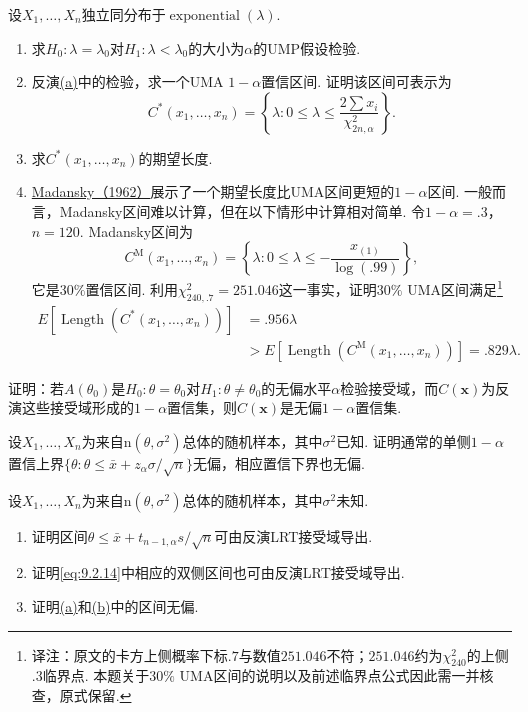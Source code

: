 \begin{exercise}\label{exercise:9.45}
设$X_1,\ldots,X_n$独立同分布于$\operatorname{exponential}(\lambda)$.
\begin{enumerate}
\item\label{item:9.45.a}求$H_0:\lambda=\lambda_0$对$H_1:\lambda<\lambda_0$的大小为$\alpha$的UMP假设检验.
\item 反演\hyperref[item:9.45.a]{(a)}中的检验，求一个UMA $1-\alpha$置信区间. 证明该区间可表示为
$$C^*(x_1,\ldots,x_n)=\left\{\lambda:0\le\lambda\le\frac{2\sum x_i}{\chi^2_{2n,\alpha}}\right\}.$$
\item 求$C^*(x_1,\ldots,x_n)$的期望长度.
\item \hyperref[bib:source213]{Madansky（1962）}展示了一个期望长度比UMA区间更短的$1-\alpha$区间. 一般而言，Madansky区间难以计算，但在以下情形中计算相对简单. 令$1-\alpha=.3$，$n=120$. Madansky区间为
$$C^{\mathrm M}(x_1,\ldots,x_n)=\left\{\lambda:0\le\lambda\le-\frac{x_{(1)}}{\log(.99)}\right\},$$
它是$30\%$置信区间. 利用$\chi^2_{240,.7}=251.046$这一事实，证明$30\%$ UMA区间满足\footnote{译注：原文的卡方上侧概率下标$.7$与数值$251.046$不符；$251.046$约为$\chi^2_{240}$的上侧$.3$临界点. 本题关于$30\%$ UMA区间的说明以及前述临界点公式因此需一并核查，原式保留.}
$$\begin{aligned}
E[\operatorname{Length}(C^*(x_1,\ldots,x_n))]&=.956\lambda\\
&>E[\operatorname{Length}(C^{\mathrm M}(x_1,\ldots,x_n))]=.829\lambda.
\end{aligned}$$

\end{enumerate}
\end{exercise}
\begin{exercise}\label{exercise:9.46}
证明：若$A(\theta_0)$是$H_0:\theta=\theta_0$对$H_1:\theta\ne\theta_0$的无偏水平$\alpha$检验接受域，而$C(\boldsymbol x)$为反演这些接受域形成的$1-\alpha$置信集，则$C(\boldsymbol x)$是无偏$1-\alpha$置信集.
\end{exercise}
\begin{exercise}\label{exercise:9.47}
设$X_1,\ldots,X_n$为来自$\mathrm n(\theta,\sigma^2)$总体的随机样本，其中$\sigma^2$已知. 证明通常的单侧$1-\alpha$置信上界$\{\theta:\theta\le\bar x+z_\alpha\sigma/\sqrt n\}$无偏，相应置信下界也无偏.
\end{exercise}
\begin{exercise}\label{exercise:9.48}
设$X_1,\ldots,X_n$为来自$\mathrm n(\theta,\sigma^2)$总体的随机样本，其中$\sigma^2$未知.
\begin{enumerate}
\item\label{item:9.48.a}证明区间$\theta\le\bar x+t_{n-1,\alpha}s/\sqrt n$可由反演LRT接受域导出.
\item\label{item:9.48.b}证明\eqref{eq:9.2.14}中相应的双侧区间也可由反演LRT接受域导出.
\item 证明\hyperref[item:9.48.a]{(a)}和\hyperref[item:9.48.b]{(b)}中的区间无偏.
\end{enumerate}
\end{exercise}
